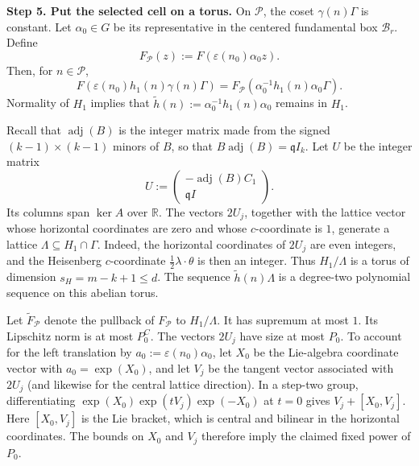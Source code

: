 \documentclass[twoside]{aomart}
\makeatletter
\theoremstyle{paperplain}
\theoremstyle{paperdefinition}
\renewenvironment{proof}[1][\proofname]{\par\pushQED{\qed}%
  \normalfont\topsep6\p@\@plus3\p@\relax\trivlist
  \item[\hskip\labelsep\itshape #1\@addpunct{.}]\ignorespaces
}{\popQED\endtrivlist\@endpefalse}
\numberwithin{equation}{section}
\makeatother
\begin{document}
\begin{proof}
\par
\medskip
\noindent\textbf{Step 5. Put the selected cell on a torus.}
On $\mathcal P$, the coset $\gamma(n)\Gamma$ is constant.  Let
$\alpha_0\in G$ be its representative in the centered fundamental box
$\mathcal B_r$.  Define
\[
 F_{\mathcal P}(z):=F(\varepsilon(n_0)\alpha_0z).
\]
Then, for $n\in\mathcal P$,
\begin{equation*}
 F(\varepsilon(n_0)h_1(n)\gamma(n)\Gamma)
 =F_{\mathcal P}(\alpha_0^{-1}h_1(n)\alpha_0\Gamma).
\end{equation*}
Normality of $H_1$ implies that
$\widetilde h(n):=\alpha_0^{-1}h_1(n)\alpha_0$ remains in $H_1$.

Recall that $\operatorname{adj}(B)$ is the integer matrix made from the
signed $(k-1)\times(k-1)$ minors of $B$, so that
$B\operatorname{adj}(B)=\mathfrak q I_k$.  Let $U$ be the integer matrix
\begin{equation*}
 U:=\begin{pmatrix}-\operatorname{adj}(B)C_1\\ \mathfrak q I\end{pmatrix}.
\end{equation*}
Its columns span $\ker A$ over $\mathbb R$.  The vectors $2U_j$, together
with the lattice vector whose horizontal coordinates are zero and whose
$c$-coordinate is $1$, generate a lattice $\Lambda\subseteq
H_1\cap\Gamma$.  Indeed, the horizontal coordinates of $2U_j$ are even integers,
and the Heisenberg $c$-coordinate
$\frac12\lambda\cdot\theta$ is then an integer.  Thus
$H_1/\Lambda$ is a torus of dimension
$s_H=m-k+1\le d$.  The sequence $\widetilde h(n)\Lambda$ is a degree-two
polynomial sequence on this abelian torus.

Let $\widetilde F_{\mathcal P}$ denote the pullback of $F_{\mathcal P}$
to $H_1/\Lambda$.  It has supremum at most $1$.
Its Lipschitz norm is at most $P_0^C$.  The vectors $2U_j$ have size at
most $P_0$.  To account for the left translation by
$a_0:=\varepsilon(n_0)\alpha_0$, let $X_0$ be the Lie-algebra coordinate
vector with $a_0=\exp(X_0)$, and let $V_j$ be the tangent vector associated
with $2U_j$ (and likewise for the central lattice direction).  In a
step-two group, differentiating
$\exp(X_0)\exp(tV_j)\exp(-X_0)$ at $t=0$ gives
$V_j+[X_0,V_j]$.  Here $[X_0,V_j]$ is the Lie bracket, which is central
and bilinear in the horizontal coordinates.  The bounds on $X_0$ and
$V_j$ therefore imply the claimed fixed power of $P_0$.


\end{proof}
\end{document}
